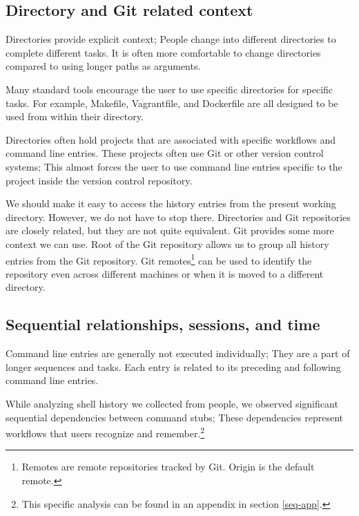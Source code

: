\subsection{Directory and Git related context}

Directories provide explicit context; People change into different directories to complete different tasks.\cite{greenberg1993computer} It is often more comfortable to change directories compared to using longer paths as arguments. 

Many standard tools encourage the user to use specific directories for specific tasks. 
For example, Makefile, Vagrantfile, and Dockerfile are all designed to be used from within their directory\cite{man-make}\cite{docs-vagrantfile}\cite{docs-dockerfile}. 

Directories often hold projects that are associated with specific workflows and command line entries. 
These projects often use Git or other version control systems; This almost forces the user to use command line entries specific to the project inside the version control repository. 

We should make it easy to access the history entries from the present working directory.
However, we do not have to stop there. Directories and Git repositories are closely related, but they are not quite equivalent. Git provides some more context we can use. 
Root of the Git repository allows us to group all history entries from the Git repository.
Git remotes\footnote{Remotes are remote repositories tracked by Git. Origin is the default remote.} can be used to identify the repository even across different machines or when it is moved to a different directory. 




\subsection{Sequential relationships, sessions, and time}

Command line entries are generally not executed individually; They are a part of longer sequences and tasks.\cite{greenberg1993computer} Each entry is related to its preceding and following command line entries. 

While analyzing shell history we collected from people, we observed significant sequential dependencies between command stubs; These dependencies represent workflows that users recognize and remember.\footnote{This specific analysis can be found in an appendix in section \ref{seq-app}.}

